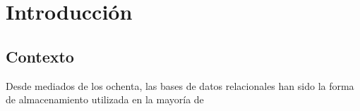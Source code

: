 \chapter{Introducción\label{cap:02intro}}

\section{Contexto}

Desde mediados de los ochenta, las bases de datos relacionales han
sido la forma de almacenamiento utilizada en la mayoría de

